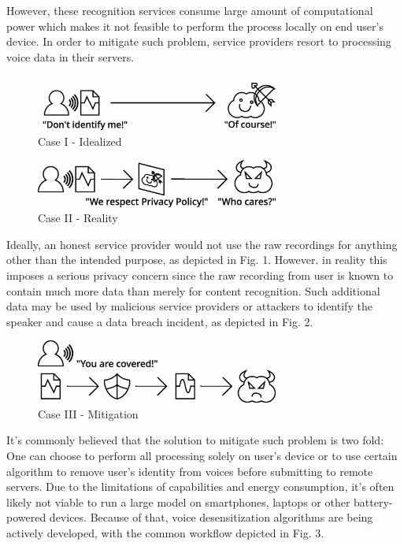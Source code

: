 \documentclass[journal]{IEEEtran} %
\begin{document}
However, these recognition services consume large amount of computational power which makes it not feasible to perform the process locally on end user's device. In order to mitigate such problem, service providers resort to processing voice data in their servers. 

\begin{figure}[htbp]
    \centerline{\includegraphics[width=8cm]{case1.png}}
    \caption{Case I - Idealized}
    \label{case1}
\end{figure}

\begin{figure}[htbp]
    \centerline{\includegraphics[width=8cm]{case2.png}}
    \caption{Case II - Reality}
    \label{case2}
\end{figure}

Ideally, an honest service provider would not use the raw recordings for anything other than the intended purpose, as depicted in Fig. 1.
However. in reality this imposes a serious privacy concern since the raw recording from user is known to contain much more data than merely for content recognition. Such additional data may be used by malicious service providers or attackers to identify the speaker and cause a data breach incident, as depicted in Fig. 2.

\begin{figure}[htbp]
    \centerline{\includegraphics[width=8cm]{case3.png}}
    \caption{Case III - Mitigation}
    \label{case3}
\end{figure}

It's commonly believed that the solution to mitigate such problem is two fold: One can choose to perform all processing solely on user's device or to use certain algorithm to remove user's identity from voices before submitting to remote servers. Due to the limitations of capabilities and energy consumption, it's often likely not viable to run a large model on smartphones, laptops or other battery-powered devices. Because of that, voice desensitization algorithms are being actively developed, with the common workflow depicted in Fig. 3.
\end{document}
